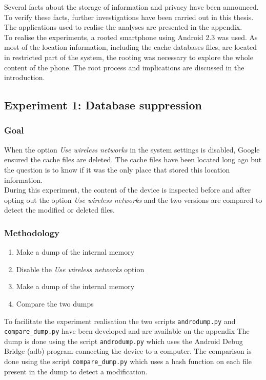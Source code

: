 Several facts about the storage of information and privacy have been announced.
To verify these facts, further investigations have been carried out in this thesis.
The applications used to realise the analyses are presented in the appendix.\\

To realise the experiments, a rooted smartphone using Android 2.3 was used.
As most of the location information, including the cache databases files, are located in restricted part of the system, the rooting was necessary to explore the whole content of the phone.
The root process and implications are discussed in the introduction.

\subsection{Experiment 1: Database suppression}

\subsubsection{Goal}

When the option \emph{Use wireless networks} in the system settings is disabled, Google ensured the cache files are deleted.
The cache files have been located long ago but the question is to know if it was the only place that stored this location information.\\

During this experiment, the content of the device is inspected before and after opting out the option \emph{Use wireless networks} and the two versions are compared to detect the modified or deleted files.

\subsubsection{Methodology}

\begin{enumerate}
\item Make a dump of the internal memory
\item Disable the \emph{Use wireless networks} option
\item Make a dump of the internal memory
\item Compare the two dumps
\end{enumerate}

To facilitate the experiment realisation the two scripts \texttt{androdump.py} and \texttt{compare\_dump.py} have been developed and are available on the appendix %
The dump is done using the script \texttt{androdump.py} which uses the Android Debug Bridge (adb) program connecting the device to a computer.
The comparison is done using the script \texttt{compare\_dump.py} which uses a hash function on each file present in the dump to detect a modification.

